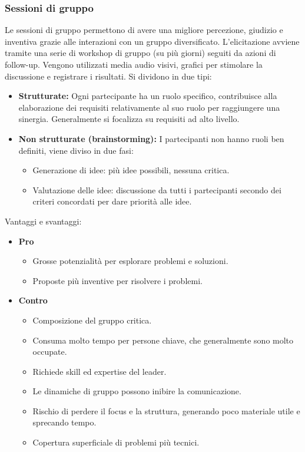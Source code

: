 \documentclass[../main.tex]{subfiles}
\begin{document}
\subsubsection{Sessioni di gruppo}
Le sessioni di gruppo permettono di avere una migliore percezione, giudizio e inventiva grazie alle interazioni con un gruppo diversificato.
L'elicitazione avviene tramite una serie di workshop di gruppo (su più giorni) seguiti da azioni di follow-up.
Vengono utilizzati media audio visivi, grafici per stimolare la discussione e registrare i risultati.
Si dividono in due tipi:
\begin{itemize}
	\item \textbf{Strutturate:} Ogni partecipante ha un ruolo specifico, contribuisce alla elaborazione dei requisiti relativamente al suo ruolo per raggiungere una sinergia.
	Generalmente si focalizza su requisiti ad alto livello.
	\item \textbf{Non strutturate (brainstorming):} I partecipanti non hanno ruoli ben definiti, viene diviso in due fasi:
	\begin{itemize}
		\item Generazione di idee: più idee possibili, nessuna critica.
		\item Valutazione delle idee: discussione da tutti i partecipanti secondo dei criteri concordati per dare priorità alle idee.
	\end{itemize}
\end{itemize}
Vantaggi e svantaggi:
\begin{itemize}
	\item \textbf{Pro}
	\begin{itemize}
		\item Grosse potenzialità per esplorare problemi e soluzioni.
		\item Proposte più inventive per risolvere i problemi.
	\end{itemize}
	\item \textbf{Contro}
	\begin{itemize}
		\item Composizione del gruppo critica.
		\item Consuma molto tempo per persone chiave, che generalmente sono molto occupate.
		\item Richiede skill ed expertise del leader.
		\item Le dinamiche di gruppo possono inibire la comunicazione.
		\item Rischio di perdere il focus e la struttura, generando poco materiale utile e sprecando tempo.
		\item Copertura superficiale di problemi più tecnici.
	\end{itemize}
\end{itemize}
\end{document}
